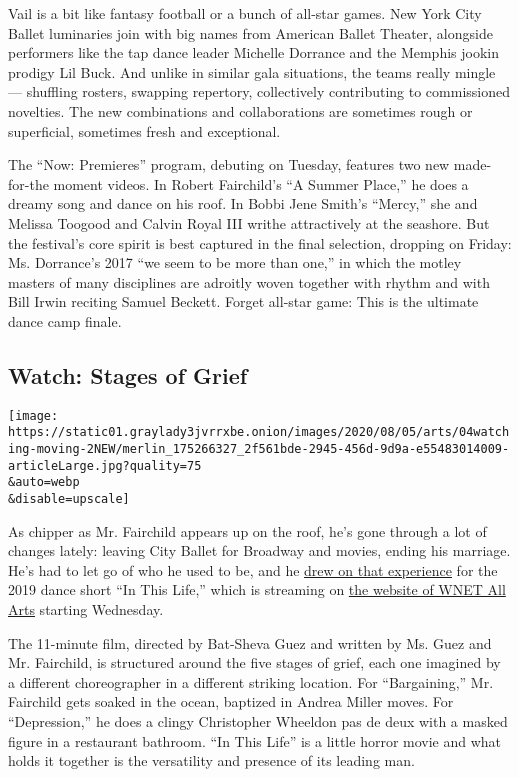Vail is a bit like fantasy football or a bunch of all-star games. New
York City Ballet luminaries join with big names from American Ballet
Theater, alongside performers like the tap dance leader Michelle
Dorrance and the Memphis jookin prodigy Lil Buck. And unlike in similar
gala situations, the teams really mingle --- shuffling rosters, swapping
repertory, collectively contributing to commissioned novelties. The new
combinations and collaborations are sometimes rough or superficial,
sometimes fresh and exceptional.

The ``Now: Premieres'' program, debuting on Tuesday, features two new
made-for-the moment videos. In Robert Fairchild's ``A Summer Place,'' he
does a dreamy song and dance on his roof. In Bobbi Jene Smith's
``Mercy,'' she and Melissa Toogood and Calvin Royal III writhe
attractively at the seashore. But the festival's core spirit is best
captured in the final selection, dropping on Friday: Ms. Dorrance's 2017
``we seem to be more than one,'' in which the motley masters of many
disciplines are adroitly woven together with rhythm and with Bill Irwin
reciting Samuel Beckett. Forget all-star game: This is the ultimate
dance camp finale.

\hypertarget{watch-stages-of-grief}{%
\subsection{Watch: Stages of Grief}\label{watch-stages-of-grief}}

\texttt{[image: https://static01.graylady3jvrrxbe.onion/images/2020/08/05/arts/04watching-moving-2NEW/merlin\_175266327\_2f561bde-2945-456d-9d9a-e55483014009-articleLarge.jpg?quality=75\\\&auto=webp\\\&disable=upscale]}

As chipper as Mr. Fairchild appears up on the roof, he's gone through a
lot of changes lately: leaving City Ballet for Broadway and movies,
ending his marriage. He's had to let go of who he used to be, and he
\href{https://www.dancemagazine.com/robbie-fairchild-short-film-2639173287.html?rebelltitem=5\#rebelltitem5}{drew
on that experience} for the 2019 dance short ``In This Life,'' which is
streaming on
\href{https://allarts.org/programs/all-arts-performance-selects/life-fvtylu/}{the
website of WNET All Arts} starting Wednesday.

The 11-minute film, directed by Bat-Sheva Guez and written by Ms. Guez
and Mr. Fairchild, is structured around the five stages of grief, each
one imagined by a different choreographer in a different striking
location. For ``Bargaining,'' Mr. Fairchild gets soaked in the ocean,
baptized in Andrea Miller moves. For ``Depression,'' he does a clingy
Christopher Wheeldon pas de deux with a masked figure in a restaurant
bathroom. ``In This Life'' is a little horror movie and what holds it
together is the versatility and presence of its leading man.

